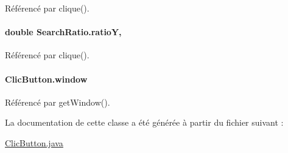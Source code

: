 Référencé par clique().

\hypertarget{classSearchRatio_a0c0087388c099310eee409fb48bcef00}{}
\paragraph[{ratio\+Y}]{\setlength{\rightskip}{0pt plus 5cm}double Search\+Ratio.\+ratio\+Y\hspace{0.3cm}{\ttfamily [package]}, {\ttfamily [inherited]}}\label{classSearchRatio_a0c0087388c099310eee409fb48bcef00}


Référencé par clique().

\hypertarget{classClicButton_a0ed15aa9c93ab63c83289b0ce3202bd0}{}
\paragraph[{window}]{ Clic\+Button.\+window\hspace{0.3cm}{\ttfamily [package]}}\label{classClicButton_a0ed15aa9c93ab63c83289b0ce3202bd0}


Référencé par get\+Window().



La documentation de cette classe a été générée à partir du fichier suivant \+:\begin{DoxyCompactItemize}
\item 
\hyperlink{ClicButton_8java}{Clic\+Button.\+java}\end{DoxyCompactItemize}
